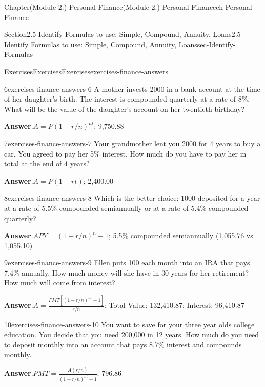 \documentclass[oneside,10pt,]{book}
\newcommand{\blocktitlefont}{\relax}
\begin{document}
\begin{chapterptx}{Chapter}{(Module 2.) Personal Finance}{}{(Module 2.) Personal Finance}{}{}{ch-Personal-Finance}
\begin{sectionptx}{Section}{2.5 Identify Formulas to use: Simple, Compound, Annuity, Loans}{}{2.5 Identify Formulas to use: Simple, Compound, Annuity, Loans}{}{}{sec-Identify-Formulas}
\begin{exercises-subsection-numberless}{Exercises}{Exercises}{}{Exercises}{}{}{exercises-finance-answers}
\begin{divisionexercise}{6}{}{}{exercises-finance-answers-6}
A mother invests \textdollar{} 2000 in a bank account at the time of her daughter's birth. The interest is compounded quarterly at a rate of 8\%. What will be the value of the daughter's account on her twentieth birthday?%
\par\smallskip%
\noindent\textbf{\blocktitlefont Answer}.\hypertarget{exercises-finance-answers-6-2}{}\quad{}\(A = P(1 + r/n)^{nt}\); \textdollar{}9,750.88%
\end{divisionexercise}%
\begin{divisionexercise}{7}{}{}{exercises-finance-answers-7}%
Your grandmother lent you \textdollar{}2000 for 4 years to buy a car. You agreed to pay her 5\% interest. How much do you have to pay her in total at the end of 4 years?%
\par\smallskip%
\noindent\textbf{\blocktitlefont Answer}.\hypertarget{exercises-finance-answers-7-2}{}\quad{}\(A = P(1 + rt)\); \textdollar{}2,400.00%
\end{divisionexercise}%
\begin{divisionexercise}{8}{}{}{exercises-finance-answers-8}%
Which is the better choice: \textdollar{}1000 deposited for a year at a rate of 5.5\% compounded semiannually or at a rate of 5.4\% compounded quarterly?%
\par\smallskip%
\noindent\textbf{\blocktitlefont Answer}.\hypertarget{exercises-finance-answers-8-2}{}\quad{}\(APY = (1 + r/n)^n - 1\); 5.5\% compounded semiannually (\textdollar{}1,055.76 vs \textdollar{}1,055.10)%
\end{divisionexercise}%
\begin{divisionexercise}{9}{}{}{exercises-finance-answers-9}%
Ellen puts \textdollar{}100 each month into an IRA that pays 7.4\% annually. How much money will she have in 30 years for her retirement? How much will come from interest?%
\par\smallskip%
\noindent\textbf{\blocktitlefont Answer}.\hypertarget{exercises-finance-answers-9-2}{}\quad{}\(A = \frac{PMT[(1+r/n)^{nt}-1]}{r/n}\); Total Value: \textdollar{}132,410.87; Interest: \textdollar{}96,410.87%
\end{divisionexercise}%
\begin{divisionexercise}{10}{}{}{exercises-finance-answers-10}%
You want to save for your three year olds college education. You decide that you need \textdollar{}200,000 in 12 years. How much do you need to deposit monthly into an account that pays 8.7\% interest and compounds monthly.%
\par\smallskip%
\noindent\textbf{\blocktitlefont Answer}.\hypertarget{exercises-finance-answers-10-2}{}\quad{}\(PMT = \frac{A(r/n)}{(1+r/n)^{nt}-1}\); \textdollar{}796.86%

\end{divisionexercise}
\end{exercises-subsection-numberless}
\end{sectionptx}
\end{chapterptx}
\end{document}
